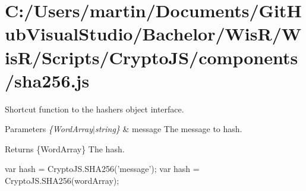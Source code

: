 \hypertarget{_c_1_2_users_2martin_2_documents_2_git_hub_visual_studio_2_bachelor_2_wis_r_2_wis_r_2_scripts_2_7490cb50c98211c5f30a7e9b91bb1059}{}\section{C\+:/\+Users/martin/\+Documents/\+Git\+Hub\+Visual\+Studio/\+Bachelor/\+Wis\+R/\+Wis\+R/\+Scripts/\+Crypto\+J\+S/components/sha256.\+js}
Shortcut function to the hasher\textquotesingle{}s object interface.


\begin{DoxyParams}{Parameters}
{\em \{\+Word\+Array$\vert$string\}} & message The message to hash.\\
\hline
\end{DoxyParams}
\begin{DoxyReturn}{Returns}
\{Word\+Array\} The hash.
\end{DoxyReturn}
\begin{DoxyVerb}var hash = CryptoJS.SHA256('message');
var hash = CryptoJS.SHA256(wordArray);\end{DoxyVerb}



